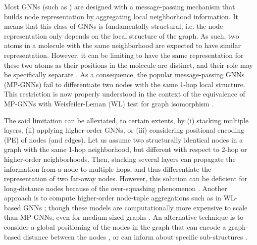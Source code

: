 \documentclass{article} \usepackage{iclr2021_conference,times}
\begin{document}
Most GNNs (such as \cite{defferrard2016convolutional,sukhbaatar2016learning, kipf2017semi, hamilton2017inductive, monti2017geometric, bresson2017residual, velivckovic2018graph, xu2018how}) are designed with a message-passing mechanism \citep{gilmer2017neural} that builds node representation by aggregating local neighborhood information. It means that this class of GNNs is fundamentally structural, i.e. the node representation only depends on the  local structure of the graph. 
As such, two atoms in a molecule with the same neighborhood 
are expected to have similar representation. However, it can be limiting to have the same representation for these two atoms as their positions in the molecule are distinct, and their role may be specifically separate \citep{murphy2019relational}. As a consequence, the popular message-passing GNNs (MP-GNNs) fail to differentiate two nodes with the same 1-hop local structure. This restriction is now properly understood in the context of the equivalence of MP-GNNs with Weisfeiler-Leman (WL) test \citep{weisfeiler1968reduction} for graph isomorphism \citep{xu2018how, morris2019weisfeiler}. 

The said limitation can be alleviated, to certain extents, by (i) stacking multiple layers, (ii) applying higher-order GNNs, or (iii) considering positional encoding (PE) of nodes (and edges). Let us assume two structurally identical nodes in a graph with the same 1-hop neighborhood, but different with respect to 2-hop or higher-order neighborhoods. Then, stacking several layers \citep{bresson2017residual, li2019deepgcns} can propagate the information from a node to multiple hops, and thus differentiate the representation of two far-away nodes. However, this solution can be deficient for long-distance nodes because of the over-squashing phenomenon \citep{alon2020bottleneck}. Another approach is to compute higher-order node-tuple aggregations such as in WL-based GNNs \citep{maron2019provably, chen2019equivalence}; though these models are computationally more expensive to scale than MP-GNNs, even for medium-sized graphs \citep{dwivedi2020benchmarking}. An alternative technique is to consider a global  positioning of the nodes in the graph that can encode a graph-based distance between the nodes \citep{you2019position, dwivedi2020benchmarking,li2020distance,dwivedi2021generalization}, or can inform about specific sub-structures \citep{bouritsas2020improving,bodnar2021weisfeiler}. 
\end{document}
